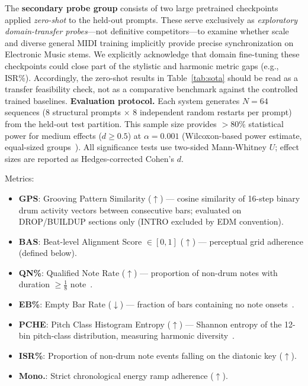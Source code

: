\documentclass[pdflatex,sn-mathphys-num,twocolumn]{sn-jnl}
\theoremstyle{thmstyleone}
\theoremstyle{thmstyletwo}
\begin{document}
The \textbf{secondary probe group} consists of two large pretrained checkpoints applied \emph{zero-shot} to the held-out prompts. These serve exclusively as \emph{exploratory domain-transfer probes}---not definitive competitors---to examine whether scale and diverse general MIDI training implicitly provide precise synchronization on Electronic Music stems. We explicitly acknowledge that domain fine-tuning these checkpoints could close part of the stylistic and harmonic metric gaps (e.g., ISR\%). Accordingly, the zero-shot results in Table~\ref{tab:sota} should be read as a transfer feasibility check, not as a comparative benchmark against the controlled trained baselines.
\textbf{Evaluation protocol.}
Each system generates $N\!=\!64$ sequences (8 structural prompts $\times$ 8 independent random restarts per prompt) from the held-out test partition.
This sample size provides ${>}80\%$ statistical power for medium effects ($d\!\geq\!0.5$) at $\alpha\!=\!0.001$ (Wilcoxon-based power estimate, equal-sized groups~\cite{faul2007gpower}).
All significance tests use two-sided Mann-Whitney $U$; effect sizes are reported as Hedges-corrected Cohen's $d$.

Metrics:
\begin{itemize}[nosep]
    \item \textbf{GPS}: Grooving Pattern Similarity ($\uparrow$) --- cosine similarity of 16-step binary drum activity vectors between consecutive bars; evaluated on DROP/BUILDUP sections only (INTRO excluded by EDM convention).
    \item \textbf{BAS}: Beat-level Alignment Score $\in[0,1]$ ($\uparrow$) --- perceptual grid adherence (defined below).
    \item \textbf{QN\%}: Qualified Note Rate ($\uparrow$) --- proportion of non-drum notes with duration $\geq\tfrac{1}{8}$ note~\cite{yang2020evaluation}.
    \item \textbf{EB\%}: Empty Bar Rate ($\downarrow$) --- fraction of bars containing no note onsets~\cite{yang2020evaluation}.
    \item \textbf{PCHE}: Pitch Class Histogram Entropy ($\uparrow$) --- Shannon entropy of the 12-bin pitch-class distribution, measuring harmonic diversity~\cite{wu2023musemorphose}.
    \item \textbf{ISR\%}: Proportion of non-drum note events falling on the diatonic key ($\uparrow$).
    \item \textbf{Mono.}: Strict chronological energy ramp adherence ($\uparrow$).
\end{itemize}
\end{document}

